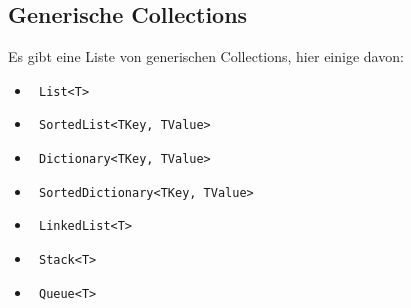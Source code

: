 \documentclass[
a4paper,
oneside,
10pt,
fleqn,
headsepline,
toc=listofnumbered, 
bibliography=totocnumbered]{scrartcl}
\begin{document}
\subsection{Generische Collections}
Es gibt eine Liste von generischen Collections, hier einige davon:

\begin{itemize}
	\item \lstinline| List<T> |
	\item \lstinline| SortedList<TKey, TValue> |
	\item \lstinline| Dictionary<TKey, TValue> |
	\item \lstinline| SortedDictionary<TKey, TValue> |
	\item \lstinline| LinkedList<T> |
	\item \lstinline| Stack<T>|
	\item \lstinline| Queue<T>|
\end{itemize}
\end{document}
